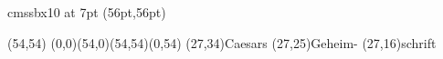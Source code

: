 

\font\myfont cmssbx10 at 7pt
\PapierGroesse(56pt,56pt)




\begin{psfigur}(54,54)
\psPolygon[fuellfarbe=0.753,eckradius=5,linienstil=](0,0)(54,0)(54,54)(0,54)
\psNeueSchicht
\rpin(27,34){\myfont Caesars}
\rpin(27,25){\myfont Geheim-}
\rpin(27,16){\myfont schrift}
\end{psfigur}
 
